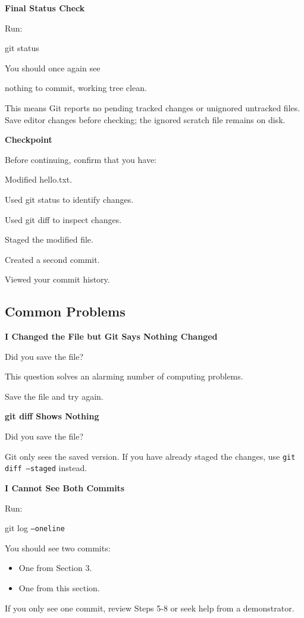 \documentclass{csc2059practical}
\begin{document}
\textbf{Final Status Check}\par

Run:
\begin{terminalplain}
git status
\end{terminalplain} 

You should once again see 
\begin{terminalplain}
nothing to commit, working tree clean.
\end{terminalplain}

This means Git reports no pending tracked changes or unignored untracked files. Save editor changes before checking; the ignored scratch file remains on disk.

\begin{reflectionbox}
\textbf{Checkpoint}\par
\medskip
Before continuing, confirm that you have:

Modified hello.txt.

Used git status to identify changes.

Used git diff to inspect changes.

Staged the modified file.

Created a second commit.

Viewed your commit history.
\end{reflectionbox}
\subsection{Common Problems}
\begin{commonerror}
\textbf{I Changed the File but Git Says Nothing Changed}\par
\medskip
Did you save the file?

This question solves an alarming number of computing problems.

Save the file and try again.
\end{commonerror}
\begin{commonerror}
\textbf{git diff Shows Nothing}\par
\medskip
Did you save the file?

Git only sees the saved version. If you have already staged the changes, use \texttt{git diff --staged} instead.
\end{commonerror}
\begin{commonerror}
\textbf{I Cannot See Both Commits}\par
\medskip
Run:

\begin{terminalplain}
  git log \texttt{--oneline}
\end{terminalplain}
You should see two commits:

\begin{itemize}
  \item One from Section 3.
  \item One from this section.
\end{itemize}
If you only see one commit, review Steps 5-8 or seek help from a demonstrator.
\end{commonerror}
\end{document}
